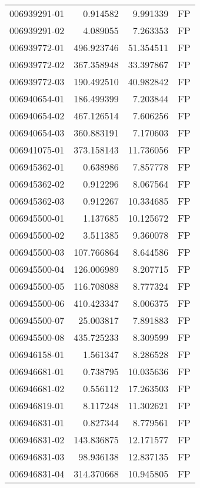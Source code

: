 \begin{tabular}{lrrl}
006939291-01 &    0.914582 &       9.991339 &   FP \\
006939291-02 &    4.089055 &       7.263353 &   FP \\
006939772-01 &  496.923746 &      51.354511 &   FP \\
006939772-02 &  367.358948 &      33.397867 &   FP \\
006939772-03 &  190.492510 &      40.982842 &   FP \\
006940654-01 &  186.499399 &       7.203844 &   FP \\
006940654-02 &  467.126514 &       7.606256 &   FP \\
006940654-03 &  360.883191 &       7.170603 &   FP \\
006941075-01 &  373.158143 &      11.736056 &   FP \\
006945362-01 &    0.638986 &       7.857778 &   FP \\
006945362-02 &    0.912296 &       8.067564 &   FP \\
006945362-03 &    0.912267 &      10.334685 &   FP \\
006945500-01 &    1.137685 &      10.125672 &   FP \\
006945500-02 &    3.511385 &       9.360078 &   FP \\
006945500-03 &  107.766864 &       8.644586 &   FP \\
006945500-04 &  126.006989 &       8.207715 &   FP \\
006945500-05 &  116.708088 &       8.777324 &   FP \\
006945500-06 &  410.423347 &       8.006375 &   FP \\
006945500-07 &   25.003817 &       7.891883 &   FP \\
006945500-08 &  435.725233 &       8.309599 &   FP \\
006946158-01 &    1.561347 &       8.286528 &   FP \\
006946681-01 &    0.738795 &      10.035636 &   FP \\
006946681-02 &    0.556112 &      17.263503 &   FP \\
006946819-01 &    8.117248 &      11.302621 &   FP \\
006946831-01 &    0.827344 &       8.779561 &   FP \\
006946831-02 &  143.836875 &      12.171577 &   FP \\
006946831-03 &   98.936138 &      12.837135 &   FP \\
006946831-04 &  314.370668 &      10.945805 &   FP \\

\end{tabular}
